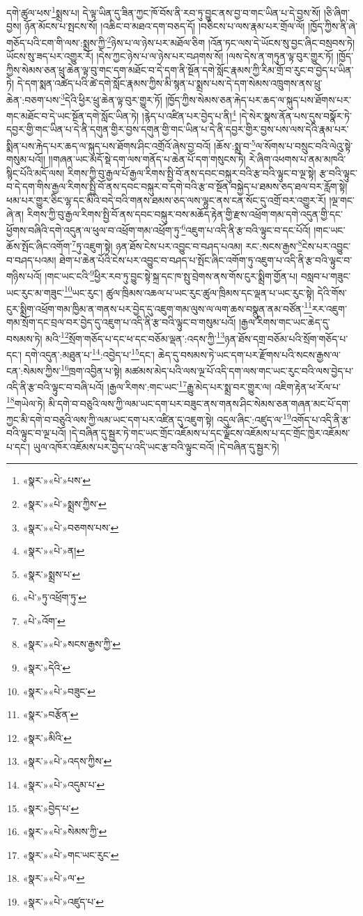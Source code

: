 དགེ་ཚུལ་ཕས་\footnote{«སྣར་»«པེ་»པས་}སྨྲས་པ། དེ་ལྟ་ཡིན་དུ་ཟིན་ཀྱང་ཁོ་བོས་ནི་རབ་ཏུ་བྱུང་ནས་བྱ་བ་གང་ཡིན་པ་དེ་བྱས་སོ། །ཅི་ཞིག་བྱས། ཉོན་མོངས་པ་སྤངས་སོ། །འཆིང་བ་མཐའ་དག་བཅད་དོ། །བཅིངས་པ་ལས་རྣམ་པར་གྲོལ་ལོ། །ཁྱོད་ཀྱིས་ནི་ཞེ་གཅོད་པའི་ངག་གི་ལས་:སྨྲས་ཀྱི་\footnote{«སྣར་»«པེ་»སྨྲས་ཀྱིས་}ཉེས་པ་ལ་ཉེས་པར་མཐོལ་ཅིག །འོན་ཏང་ལས་དེ་ཡོངས་སུ་བྱང་ཞིང་བསྲབས་ཏེ། ཡོངས་སུ་ཟད་པར་འགྱུར་རོ། །དེས་ཀྱང་ཉེས་པ་ལ་ཉེས་པར་བཤགས་སོ། །ལས་དེས་ན་གཏུན་ལྟ་བུར་གྱུར་ཏོ། །ཁྱོད་ཀྱིས་སེམས་ཅན་ཕྲུ་ཆེན་ལྟ་བུ་གང་དག་མཐོང་བ་དེ་དག་ནི་སྔོན་དགེ་སློང་རྣམས་ཀྱི་རིམ་གྲོ་བ་རུང་བ་བྱེད་པ་ཡིན་ཏེ། དེ་དག་སྨན་འཚེད་པའི་ཚེ་དགེ་སློང་རྣམས་ཀྱིས་མི་སྙན་པ་སྨྲས་པས་དེ་དག་སེམས་འཁྲུགས་ནས་ཕྲུ་ཆེན་:བཅག་པས་\footnote{«སྣར་»«པེ་»བཅགས་པས་}དེའི་ཕྱིར་ཕྲུ་ཆེན་ལྟ་བུར་གྱུར་ཏོ། །ཁྱོད་ཀྱིས་སེམས་ཅན་རྐེད་པར་ཆད་ལ་སྐུད་པས་ཐོགས་པར་གང་མཐོང་བ་དེ་ཡང་སྔོན་དགེ་སློང་ཡིན་ཏེ། །རྙེད་པ་འཛིན་པར་བྱེད་པ་ནི།\footnote{«སྣར་»«པེ་»ན།} །དེ་སེར་སྣས་ནོན་པས་དུས་བསྣོར་ཏེ་དབྱར་གྱི་གང་ཡིན་པ་དེ་ནི་དགུན་གྱིར་བྱས་དགུན་གྱི་གང་ཡིན་པ་དེ་ནི་དབྱར་གྱིར་བྱས་པས་ལས་དེའི་རྣམ་པར་སྨིན་པས་རྐེད་པར་ཆད་ལ་སྐུད་པས་ཐོགས་ཤིང་འགྲོའོ་ཞེས་བྱ་བའོ། །ཆོས་:སྨྲ་བ་\footnote{«སྣར་»སྨྲས་པ་}ལ་སོགས་པ་བསྲུང་བའི་ལེའུ་སྟེ་གསུམ་པའོ།། །།གཞན་ཡང་མདོ་སྡེ་དག་ལས་གནོད་པ་ཆེན་པོ་དག་གསུངས་ཏེ། རེ་ཞིག་འཕགས་པ་ནམ་མཁའི་སྙིང་པོའི་མདོ་ལས། རིགས་ཀྱི་བུ་རྒྱལ་པོ་རྒྱལ་རིགས་སྤྱི་བོ་ནས་དབང་བསྐུར་བའི་རྩ་བའི་ལྟུང་བ་ལྔ་སྟེ། རྩ་བའི་ལྟུང་བ་དེ་དག་གིས་རྒྱལ་རིགས་སྤྱི་བོ་ནས་དབང་བསྐུར་བ་དགེ་བའི་རྩ་བ་སྔོན་བསྐྱེད་པ་ཐམས་ཅད་ཐལ་བར་རློག་སྟེ། ཕམ་པར་གྱུར་ཅིང་ལྷ་དང་མིའི་བདེ་བའི་གནས་ཐམས་ཅད་ལས་ལྷུང་ནས་ངན་སོང་དུ་འགྲོ་བར་འགྱུར་རོ། །ལྔ་གང་ཞེ་ན། རིགས་ཀྱི་བུ་རྒྱལ་རིགས་སྤྱི་བོ་ནས་དབང་བསྐུར་བས་མཆོད་རྟེན་གྱི་རྫས་འཕྲོག་གམ་དགེ་འདུན་གྱི་དང་ཕྱོགས་བཞིའི་དགེ་འདུན་ལ་ཕུལ་བ་འཕྲོག་གམ་འཕྲོག་ཏུ་\footnote{«པེ་»ཏུ་འཕྲོག་ཏུ་}འཇུག་པ་འདི་ནི་རྩ་བའི་ལྟུང་བ་དང་པོའོ། །གང་ཡང་ཆོས་སྤོང་ཞིང་འགོག་\footnote{«པེ་»འོག་}ཏུ་འཇུག་སྟེ། ཉན་ཐོས་ངེས་པར་འབྱུང་བ་བཤད་པའམ། རང་:སངས་རྒྱས་\footnote{«སྣར་»«པེ་»སངས་རྒྱས་ཀྱི་}ངེས་པར་འབྱུང་བ་བཤད་པའམ། ཐེག་པ་ཆེན་པོའི་ངེས་པར་འབྱུང་བ་བཤད་པ་སྤོང་ཞིང་འགོག་ཏུ་འཇུག་པ་འདི་ནི་རྩ་བའི་ལྟུང་བ་གཉིས་པའོ། །གང་ཡང་ངའི་\footnote{«སྣར་»དེའི་}ཕྱིར་རབ་ཏུ་བྱུང་སྟེ་སྐྲ་དང་ཁ་སྤུ་བྲེགས་ནས་གོས་ངུར་སྨྲིག་གྱོན་པ། བསླབ་པ་གཟུང་ཡང་རུང་མ་གཟུང་\footnote{«སྣར་»«པེ་»བཟུང་}ཡང་རུང་། ཚུལ་ཁྲིམས་འཆལ་པ་ཡང་རུང་ཚུལ་ཁྲིམས་དང་ལྡན་པ་ཡང་རུང་སྟེ། དེའི་གོས་ངུར་སྨྲིག་འཕྲོག་གམ་ཁྱིམ་ན་གནས་པར་བྱེད་དུ་འཇུག་གམ་ལུས་ལ་ལག་ཆས་བསྣུན་ནམ་བཙོན་\footnote{«སྣར་»བརྩོན་}རར་འཇུག་གམ་སྲོག་དང་བྲལ་བར་བྱེད་དུ་འཇུག་པ་འདི་ནི་རྩ་བའི་ལྟུང་བ་གསུམ་པའོ། །རྒྱལ་རིགས་གང་ཡང་ཆེད་དུ་བསམས་ཏེ། མའི་\footnote{«སྣར་»མིའི་}སྲོག་གཅོད་པ་དང་ཕ་དང་བཅོམ་ལྡན་:འདས་ཀྱི་\footnote{«སྣར་»«པེ་»འདས་ཀྱིས་}ཉན་ཐོས་དགྲ་བཅོམ་པའི་སྲོག་གཅོད་པ་དང་། དགེ་འདུན་:མཐུན་པ་\footnote{«སྣར་»«པེ་»འདུམ་པ་}:འབྱེད་པ་\footnote{«སྣར་»བྱེད་པ་}དང་། ཆེད་དུ་བསམས་ཏེ་ཡང་དག་པར་རྫོགས་པའི་སངས་རྒྱས་ལ་ངན་:སེམས་ཀྱིས་\footnote{«སྣར་»«པེ་»སེམས་ཀྱི་}ཁྲག་འབྱིན་པ་སྟེ། མཚམས་མེད་པའི་ལས་ལྔ་པོ་འདི་དག་ལས་གང་ཡང་རུང་བའི་ལས་བྱེད་པ་འདི་ནི་རྩ་བའི་ལྟུང་བ་བཞི་པའོ། །རྒྱལ་རིགས་:གང་ཡང་\footnote{«སྣར་»«པེ་»གང་ཡང་རུང་}རྒྱུ་མེད་པར་སྨྲ་བར་གྱུར་ལ། འཇིག་རྟེན་ཕ་རོལ་པ་\footnote{«སྣར་»«པེ་»ལ་}གཡེལ་ཏེ། མི་དགེ་བ་བཅུའི་ལས་ཀྱི་ལམ་ཡང་དག་པར་བཟུང་ནས་གནས་ཤིང་སེམས་ཅན་གཞན་མང་པོ་དག་ཀྱང་མི་དགེ་བ་བཅུའི་ལས་ཀྱི་ལམ་ཡང་དག་པར་འཛིན་དུ་འཇུག་སྟེ། འདུལ་ཞིང་:འཛུད་ལ་\footnote{«སྣར་»«པེ་»འཛུད་པ་}འགོད་པ་འདི་ནི་རྩ་བའི་ལྟུང་བ་ལྔ་པའོ། །དེ་བཞིན་དུ་སྦྱར་ཏེ་གང་ཡང་གྲོང་འཇོམས་པ་དང་ལྗོངས་འཇོམས་པ་དང་གྲོང་ཁྱེར་འཇོམས་པ་དང་། ཡུལ་འཁོར་འཇོམས་པར་བྱེད་པ་འདི་ཡང་རྩ་བའི་ལྟུང་བའོ། །དེ་བཞིན་དུ་སྦྱར་ཏེ། 